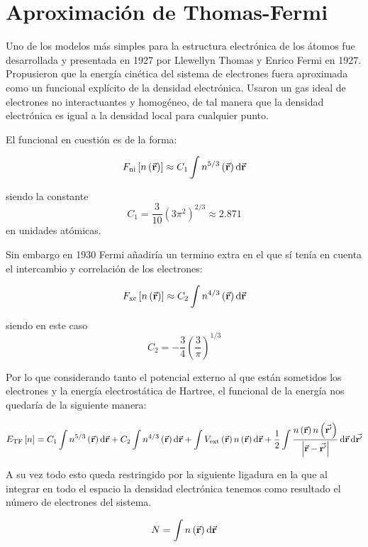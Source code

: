 \section{Aproximación de Thomas-Fermi}

Uno de los modelos más simples para la estructura electrónica de los átomos fue desarrollada y presentada en 1927 por Llewellyn Thomas y Enrico Fermi en 1927. Propusieron que la energía cinética del sistema de electrones fuera aproximada como un funcional explícito de la densidad electrónica. Usaron un gas ideal de electrones no interactuantes y homogéneo, de tal manera que la densidad electrónica es igual a la densidad local para cualquier punto.

El funcional en cuestión es de la forma:

\begin{equation}
    F_{\text{ni}} \left[ n \left( \va{r} \right) \right] \approx C_1 \int n^{5/3} \left( \va{r} \right) \dd{\va{r}}
\end{equation}

siendo la constante \begin{equation}
    C_1 = \frac{3}{10} (3 \pi^2)^{2/3} \approx 2.871
\end{equation} en unidades atómicas.

Sin embargo en 1930 Fermi añadiría un termino extra en el que sí tenía en cuenta el intercambio y correlación de los electrones:

\begin{equation}
    F_{\text{xc}}\left[ n \left( \va{r} \right) \right] \approx C_2 \int n^{4/3} \left( \va{r} \right) \dd{\va{r}}
\end{equation}

siendo en este caso \begin{equation}
    C_2 = - \frac{3}{4} \left( \frac{3}{\pi} \right)^{1/3}
\end{equation}

Por lo que considerando tanto el potencial externo al que están sometidos los electrones y la energía electrostática de Hartree, el funcional de la energía nos quedaría de la siguiente manera:

\begin{equation}
    E_{\text{TF}} \left[ n \right] = C_1 \int n^{5/3} \left( \va{r} \right) \dd{\va{r}} + C_2 \int n^{4/3} \left( \va{r} \right) \dd{\va{r}} + \int V_{\text{ext}} \left( \va{r} \right) n \left( \va{r} \right) \dd{\va{r}}  + \frac{1}{2} \int \frac{n \left( \va{r} \right) n \left( \va{r'} \right)}{\abs{ \va{r} - \va{r'} } } \dd{\va{r}} \dd{\va{r'}}
\end{equation}

A su vez todo esto queda restringido por la siguiente ligadura en la que al integrar en todo el espacio la densidad electrónica tenemos como resultado el número de electrones del sistema.

\begin{equation}
    N = \int n \left( \va{r} \right)  \dd{\va{r}}
\end{equation}

